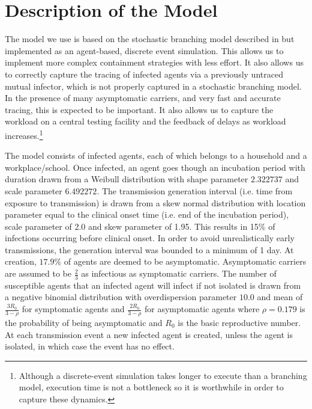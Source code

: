 \documentclass{article}
\begin{document}
\section{Description of the Model}

The model we use is based on the stochastic branching model described in \cite{hellewellfeasibility} but implemented as an agent-based, discrete event simulation. This allows us to implement more complex containment strategies with less effort. It also allows us to correctly capture the tracing of infected agents via a previously untraced mutual infector, which is not properly captured in a stochastic branching model. In the presence of many asymptomatic carriers, and very fast and accurate tracing, this is expected to be important. It also allows us to capture the workload on a central testing facility and the feedback of delays as workload increases.\footnote{Although a discrete-event simulation takes longer to execute than a branching model, execution time is not a bottleneck so it is worthwhile in order to capture these dynamics.} 

The model consists of infected agents, each of which belongs to a household and a workplace/school. Once infected, an agent goes though an incubation period with duration drawn from a Weibull distribution with shape parameter $2.322737$ and scale parameter $6.492272$\cite{backer2020incubation}. The transmission generation interval (i.e. time from exposure to transmission) is drawn from a skew normal distribution with location parameter equal to the clinical onset time (i.e. end of the incubation period), scale parameter of 2.0 and skew parameter of 1.95\cite{hellewellfeasibility}. This results in 15\% of infections occurring before clinical onset\cite{hellewellfeasibility}. In order to avoid unrealistically early transmissions, the generation interval was bounded to a minimum of 1 day. At creation, $17.9\%$ of agents are deemed to be asymptomatic\cite{:/content/10.2807/1560-7917.ES.2020.25.10.2000180}. Asymptomatic carriers are assumed to be $\frac{2}{3}$ as infectious as symptomatic carriers\cite{ferguson2020impact}. The number of susceptible agents that an infected agent will infect if not isolated is drawn from a negative binomial distribution with overdispersion parameter $10.0$\cite{zhuang2020preliminary}\cite{riou2020pattern} and mean of $\frac{3R_0}{3 - \rho}$ for symptomatic agents and $\frac{2R_0}{3 - \rho}$ for asymptomatic agents where $\rho=0.179$ is the probability of being asymptomatic and $R_0$ is the basic reproductive number. At each transmission event a new infected agent is created, unless the agent is isolated, in which case the event has no effect.
\end{document}
